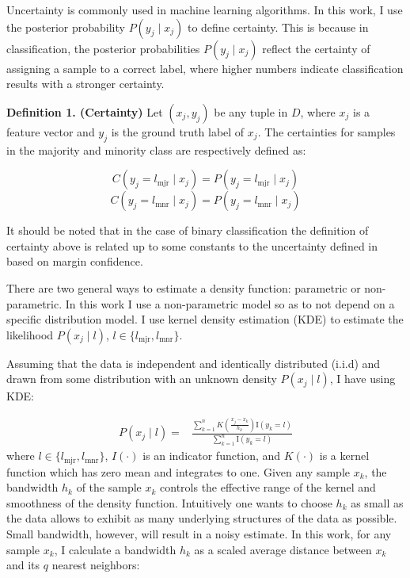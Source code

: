 \documentclass{iitthesis}
\begin{document}
 
Uncertainty is commonly used in machine learning algorithms. In this work, I use the posterior probability $P(y_j \mid x_j)$ to define certainty. This is because in classification, the posterior probabilities $P(y_j \mid x_j)$ reflect the certainty of assigning a sample to a correct label, where higher numbers indicate classification results with a stronger certainty.

\noindent \textbf{Definition 1. (Certainty)} Let $(x_j, y_j)$ be any tuple in $D$, where $x_j$ is a feature vector and $y_j$ is the ground truth label of $x_j$. The certainties for samples in the majority and minority class are respectively defined as:

\begin{equation}
C(y_j=l_{\mbox{mjr}} \mid x_j) = P(y_j=l_{\mbox{mjr}}\mid x_j)
\end{equation}
\begin{equation}
C(y_j=l_{\mbox{mnr}} \mid x_j) = P(y_j=l_{\mbox{mnr}}\mid x_j)
\end{equation} 

It should be noted that in the case of binary classification the definition of certainty above is related up to some constants to the uncertainty defined in \cite{2013Sharma} based on margin confidence.

 There are two general ways to estimate a density function: parametric or non-parametric. In this work I use a non-parametric model so as to not depend on a specific distribution model. I use kernel density estimation (KDE)\cite{elgammal2002background}\cite{zhang2006bayesian} to estimate the likelihood $P(x_j\mid l)$, $l\in \{l_{\mbox{mjr}}, l_{\mbox{mnr}}\}$.

Assuming that the data is independent and identically distributed (i.i.d) and drawn from some distribution with an unknown density $P(x_j \mid l)$, I have using KDE:

\begin{equation}
\begin{split}
P(x_j \mid l) =& \frac{\sum_{k=1}^n K(\frac{x_j-x_k}{h_k}) \mathrm{I}(y_k=l)}{\sum_{k=1}^n \mathrm{I}(y_k=l)}
\end{split}
\end{equation}
where $l \in \{l_{\mbox{mjr}}, l_{\mbox{mnr}}\}$, $I(\cdot)$ is an indicator function, and $K(\cdot)$ is a kernel function which has zero mean and integrates to one. Given any sample $x_k$, the bandwidth $h_k$ of the sample $x_k$ controls the effective range of the kernel and smoothness of the density function. Intuitively one wants to choose $h_k$ as small as the data allows to exhibit as many underlying structures of the data as possible. Small bandwidth, however, will result in a noisy estimate. In this work, for any sample $x_k$, I calculate a bandwidth $h_k$ as a scaled average distance between $x_k$ and its $q$ nearest neighbors:
\end{document}
